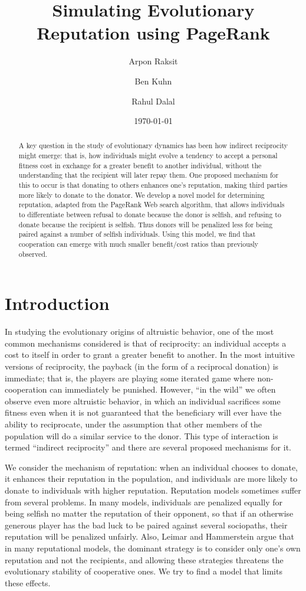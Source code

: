 \documentclass{amsart}
\title{Simulating Evolutionary Reputation using PageRank}
\author{Arpon Raksit \and Ben Kuhn \and Rahul Dalal}
\date{\today}
\begin{document}
\begin{abstract}
A key question in the study of evolutionary dynamics has been how
indirect reciprocity might emerge: that is, how individuals might
evolve a tendency to accept a personal fitness cost in exchange for a
greater benefit to another individual, without the understanding that
the recipient will later repay them. One proposed mechanism for this
to occur is that donating to others enhances one's reputation, making
third parties more likely to donate to the donator. We develop a novel
model for determining reputation, adapted from the PageRank Web search
algorithm, that allows individuals to differentiate between refusal to
donate because the donor is selfish, and refusing to donate because
the recipient is selfish. Thus donors will be penalized less for being
paired against a number of selfish individuals. Using this model, we
find that cooperation can emerge with much smaller benefit/cost ratios
than previously observed.
\end{abstract}

\maketitle

\section{Introduction}

In studying the evolutionary origins of altruistic behavior, one of
the most common mechanisms considered is that of reciprocity: an
individual accepts a cost to itself in order to grant a greater
benefit to another. In the most intuitive versions of reciprocity, the
payback (in the form of a reciprocal donation) is immediate; that is,
the players are playing some iterated game where non-cooperation can
immediately be punished. However, ``in the wild'' we often observe
even more altruistic behavior, in which an individual sacrifices some
fitness even when it is not guaranteed that the beneficiary will ever
have the ability to reciprocate, under the assumption that other
members of the population will do a similar service to the donor. This
type of interaction is termed ``indirect reciprocity'' and there are
several proposed mechanisms for it.

We consider the mechanism of reputation: when an individual chooses to
donate, it enhances their reputation in the population, and
individuals are more likely to donate to individuals with higher
reputation. Reputation models sometimes suffer from several
problems. In many models, individuals are penalized equally for being
selfish no matter the reputation of their opponent, so that if an
otherwise generous player has the bad luck to be paired against
several sociopaths, their reputation will be penalized unfairly. Also,
Leimar and Hammerstein \cite{leimar_evolution_2001} argue that in many
reputational models, the dominant strategy is to consider only one's
own reputation and not the recipients, and allowing these strategies
threatens the evolutionary stability of cooperative ones. We try to
find a model that limits these effects.
\end{document}
